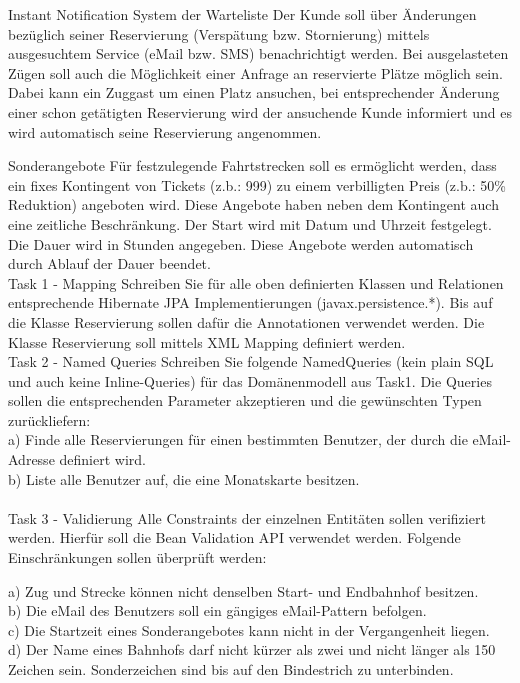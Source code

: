 Instant Notification System der Warteliste
Der Kunde soll über Änderungen bezüglich seiner Reservierung (Verspätung bzw. Stornierung) mittels ausgesuchtem Service (eMail bzw. SMS) benachrichtigt werden. Bei ausgelasteten Zügen soll auch die Möglichkeit einer Anfrage an reservierte Plätze möglich sein. Dabei kann ein Zuggast um einen Platz ansuchen, bei entsprechender Änderung einer schon getätigten Reservierung wird der ansuchende Kunde informiert und es wird automatisch seine Reservierung angenommen.\\

\clearpage

Sonderangebote
Für festzulegende Fahrtstrecken soll es ermöglicht werden, dass ein fixes Kontingent von Tickets (z.b.: 999) zu einem verbilligten Preis (z.b.: 50\% Reduktion) angeboten wird. Diese Angebote haben neben dem Kontingent auch eine zeitliche Beschränkung. Der Start wird mit Datum und Uhrzeit festgelegt. Die Dauer wird in Stunden angegeben. Diese Angebote werden automatisch durch Ablauf der Dauer beendet.\\

Task 1 - Mapping
Schreiben Sie für alle oben definierten Klassen und Relationen entsprechende Hibernate JPA Implementierungen (javax.persistence.*). Bis auf die Klasse Reservierung sollen dafür die Annotationen verwendet werden. Die Klasse Reservierung soll mittels XML Mapping definiert werden.\\

Task 2 - Named Queries
Schreiben Sie folgende NamedQueries (kein plain SQL und auch keine Inline-Queries) für das Domänenmodell aus Task1. Die Queries sollen die entsprechenden Parameter akzeptieren und die gewünschten Typen zurückliefern:\\

a) Finde alle Reservierungen für einen bestimmten Benutzer, der durch die eMail-Adresse definiert wird.\\
b) Liste alle Benutzer auf, die eine Monatskarte besitzen.\\
\\

Task 3 - Validierung
Alle Constraints der einzelnen Entitäten sollen verifiziert werden. Hierfür soll die Bean Validation API verwendet werden. Folgende Einschränkungen sollen überprüft werden:

a) Zug und Strecke können nicht denselben Start- und Endbahnhof besitzen.\\
b) Die eMail des Benutzers soll ein gängiges eMail-Pattern befolgen.\\
c) Die Startzeit eines Sonderangebotes kann nicht in der Vergangenheit liegen.\\
d) Der Name eines Bahnhofs darf nicht kürzer als zwei und nicht länger als 150 Zeichen sein. Sonderzeichen sind bis auf den Bindestrich zu unterbinden.\\


